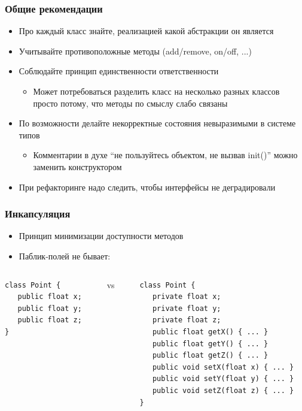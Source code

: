 \documentclass[xetex,mathserif,serif]{beamer}
\begin{document}
	\begin{frame}
		\frametitle{Общие рекомендации}
		\begin{itemize}
			\item Про каждый класс знайте, реализацией какой абстракции он является
			\item Учитывайте противоположные методы (add/remove, on/off, ...)
			\item Соблюдайте принцип единственности ответственности
			\begin{itemize}
				\item Может потребоваться разделить класс на несколько разных классов просто потому, что методы по смыслу слабо связаны
			\end{itemize}
			\item По возможности делайте некорректные состояния невыразимыми в системе типов
			\begin{itemize}
				\item Комментарии в духе ``не пользуйтесь объектом, не вызвав  init()'' можно заменить конструктором
			\end{itemize}
			\item При рефакторинге надо следить, чтобы интерфейсы не деградировали
		\end{itemize}
	\end{frame}

	\begin{frame}[fragile]
		\frametitle{Инкапсуляция}
		\begin{itemize}
			\item Принцип минимизации доступности методов
			\item Паблик-полей не бывает:
		\end{itemize}
		\begin{columns}
			\begin{column}{0.25\textwidth}
				\begin{verbatim}
class Point {
   public float x;
   public float y;
   public float z;
}
				\end{verbatim}
			\end{column}
			\begin{column}{0.1\textwidth}
				vs
			\end{column}
			\begin{column}{0.5\textwidth}
				\begin{verbatim}
class Point {
   private float x;
   private float y;
   private float z;
   public float getX() { ... }
   public float getY() { ... }
   public float getZ() { ... }
   public void setX(float x) { ... }
   public void setY(float y) { ... }
   public void setZ(float z) { ... }
}
				\end{verbatim}
			\end{column}
		\end{columns}
\end{frame}
\end{document}
